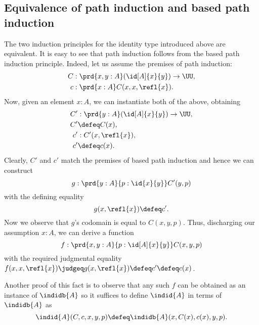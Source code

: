 \subsection{Equivalence of path induction and based path induction}

The two induction principles for the identity type introduced above are equivalent.
It is easy to see that path induction follows from the based path induction principle.
Indeed, let us assume the premises of path induction:
\begin{align*}
C &: \prd{x,y:A}(\id[A]{x}{y}) \to \UU,\\
c &: \prd{x:A} C(x,x,\refl{x}).
\end{align*}
Now, given an element $x:A$, we can instantiate both of the above, obtaining
\begin{align*}
C' &: \prd{y:A} (\id[A]{x}{y}) \to \UU,  \\
C' &\defeq C(x), \\
c' &: C'(x,\refl{x}), \\
c' &\defeq c(x).
\end{align*}
Clearly, $C'$ and $c'$ match the premises of based path induction and hence we can construct 
\begin{equation*}
  g : \prd{y:A}{p : \id{x}{y}} C'(y,p)
\end{equation*}
with the defining equality
\[ g(x,\refl{x}) \defeq c'.\]
Now we observe that $g$'s codomain is equal to $C(x,y,p)$.
Thus, discharging our assumption $x:A$, we can derive a function 
\[ f : \prd{x,y:A}{p : \id[A]{x}{y}} C(x,y,p) \]
with the required judgmental equality $f(x,x,\refl{x}) \judgeq g(x,\refl{x}) \defeq c' \defeq c(x)$.

Another proof of this fact is to observe that any such $f$ can be obtained as an instance of $\indidb{A}$
so it suffices to define $\indid{A}$ in terms of $\indidb{A}$ as
\[ \indid{A}(C,c,x,y,p) \defeq \indidb{A}(x,C(x),c(x),y,p). \]

